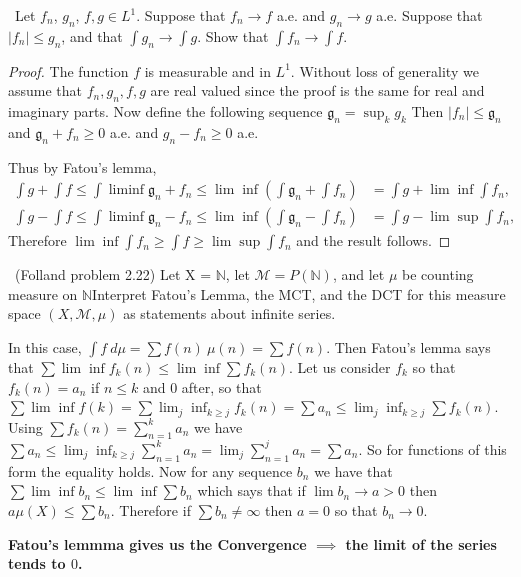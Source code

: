 \documentclass[11pt]{amsart}
\theoremstyle{definition}
\numberwithin{theorem}{section}
\numberwithin{definition}{section}
\numberwithin{equation}{section}
\def\scriptm{{\mathcal M}}
\begin{document}
\medskip {}\ Let $f_n$, $g_n$, $f, g \in L^1$. Suppose that $f_n \to f$  a.e. and $g_n \to g$ a.e. Suppose that $|f_n| \leq g_n$, and that $\int g_n \to \int g$. Show that $\int f_n \to \int f$. 
\begin{proof}
  The function $f$ is measurable and in $L^1.$ Without loss of generality we assume that $f_n, g_n, f, g$ are real valued since the proof is the same for real and imaginary parts. Now define the following sequence $\mathfrak{g}_n = \sup_{k} g_k$ Then $|f_n| \leq \mathfrak{g}_n$ and $\mathfrak{g}_n+f_n \geq 0$ a.e. and $g_n - f_n \geq 0$ a.e. 

   Thus by Fatou's lemma,
  \begin{equation*}
    \begin{aligned}
      \int g+ \int f \leq \int \liminf \mathfrak{g}_n + f_n \leq \lim \inf \left( \int \mathfrak{g}_n + \int f_n\right) &= \int g + \lim \inf \int f_n, \\
       \int g- \int f \leq \int \liminf \mathfrak{g}_n - f_n \leq \lim \inf \left( \int \mathfrak{g}_n - \int f_n\right) &= \int g - \lim \sup \int f_n, 
    \end{aligned}
  \end{equation*}
  Therefore $\lim\inf \int f_n \geq \int f \geq \lim \sup \int f_n$ and the result follows.  
\end{proof}

\medskip {}\ (Folland problem 2.22) Let X = $\mathbb{N}$, let $\scriptm = P(\mathbb{N})$, and let $\mu$ be counting measure on $\mathbb{N}$Interpret Fatou's Lemma, the MCT, and the DCT for this measure space $(X, \scriptm, \mu)$ as statements about infinite series. 

In this case, $\int f\ d\mu = \sum f(n)\ \mu({n}) = \sum f(n).$ Then Fatou's lemma says that $\sum \lim \inf f_k(n) \leq \lim \inf \sum f_k(n)$. Let us consider $f_k$ so that $f_k(n) = a_n$ if $n \leq k$ and $0$ after, so that $\sum \lim \inf f(k) = \sum \lim_j \inf_{k\geq j} f_k(n) = \sum a_n \leq \lim_j \inf_{k \geq j} \sum f_k(n)$. Using $\sum f_k(n) = \sum_{n=1}^k a_n$ we have $\sum a_n \leq \lim_j \inf_{k\geq j} \sum_{n=1}^k a_n = \lim_j \sum_{n=1}^j a_n =\sum a_n.$ So for functions of this form the equality holds. Now for any sequence $b_n$ we have that $\sum \lim \inf b_n \leq \lim \inf \sum b_n$ which says that if $\lim b_n \to a > 0$ then $a \mu(X) \leq \sum b_n$.
Therefore if $\sum b_n \neq\infty$ then $a = 0$ so that $b_n \to 0$.

\textbf{Fatou's lemmma gives us the Convergence $\implies $ the limit of the series tends to $0$.}
\end{document}
